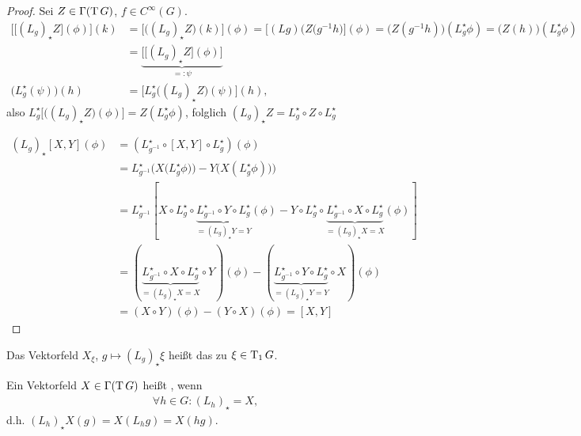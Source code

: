 \begin{proof}
	Sei $Z\in\Gamma(\operatorname{T} G)$, $f\in C^\infty(G)$.
	\begin{align*}
		\Big[\big[(L_g)_\star Z\big](\phi)\Big](k) &= \Big[\big((L_g)_\star Z\big)(k)\Big](\phi) = \Big[(L g)\big(Z (g^{-1}h\big)\Big](\phi) = \big( Z(g^{-1} h)\big)(L^\star_g \phi) = \big(Z(h)\big)(L_g^\star \phi) \\
		&= \underbrace{\Big[\big[(L_g)_\star Z\big](\phi)\Big]}_{=:\psi}\\
		\big(L_g^\star(\psi)\big)(h) &= \Big[L_g^\star\big((L_g)_\star Z\big)(\psi)\Big](h),
	\end{align*}
	also $L^\star_g \Big[\big((L_g)_\star Z\big)(\phi)\Big] = Z(L_g^\star \phi)$, folglich $(L_g)_\star Z = L_g^\star \circ Z\circ L_g^\star$
	\begin{center}
	\end{center}
	\begin{align*}
		(L_g)_\star[X,Y](\phi) &= (L_{g^{-1}}^\star\circ [X,Y]\circ L_g^\star)(\phi)\\
		&= L_{g^{-1}}^\star\Big(X\big(L_g^\star \phi)\big) - Y\big(X(L_g^\star \phi)\big)\Big) \\
		&= L_{g^{-1}}^\star [ X\circ L_g^\star\circ \underbrace{L_{g^{-1}}^\star \circ Y\circ L_g^\star}_{=(L_g)_\star Y = Y}(\phi) - Y\circ L_g^\star \circ \underbrace{L_{g^{-1}}^\star\circ X\circ L_g^\star}_{=(L_g)_\star X=X}(\phi)] \\
		&= (\underbrace{L_{g^{-1}}^\star \circ X\circ L_g^\star}_{=(L_g)_\star X = X} \circ Y)(\phi) - (\underbrace{L_{g^{-1}}^\star \circ Y\circ L_g^\star}_{=(L_g)_\star Y=Y} \circ X)(\phi)\\
		&= (X\circ Y)(\phi) - (Y\circ X)(\phi) = [X,Y]
	\end{align*}
\end{proof}

\begin{definition}
	Das Vektorfeld $X_\xi$, $g\mapsto (L_g)_\star \xi$ heißt das  zu $\xi\in \operatorname{T}_1 G$.
\end{definition}

\begin{definition}
	Ein Vektorfeld $X\in\Gamma(\operatorname{T} G)$ heißt , wenn \begin{align*}
		\forall h\in G\colon (L_h)_\star = X,
	\end{align*}
	d.h. $(L_h)_\star X(g) = X(L_h g) = X(h g)$.
\end{definition}

